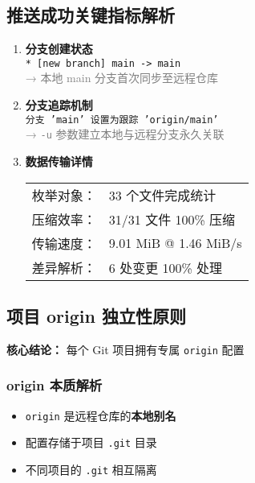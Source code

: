 \subsection{推送成功关键指标解析}
\begin{enumerate}[leftmargin=*, nosep]
    \item \textbf{分支创建状态} \\
    \texttt{* [new branch] main -> main} \\
    \textcolor{gray}{→ 本地 main 分支首次同步至远程仓库}
    
    \item \textbf{分支追踪机制} \\
    \texttt{分支 'main' 设置为跟踪 'origin/main'} \\
    \textcolor{gray}{→ \texttt{-u} 参数建立本地与远程分支永久关联}
    
    \item \textbf{数据传输详情} \\
    \begin{tabular}{@{}ll@{}}
        枚举对象： & 33 个文件完成统计 \\
        压缩效率： & 31/31 文件 100\% 压缩 \\
        传输速度： & 9.01 MiB @ 1.46 MiB/s \\
        差异解析： & 6 处变更 100\% 处理 \\
    \end{tabular}
\end{enumerate}

\subsection{项目 origin 独立性原则}
\textbf{核心结论：} 每个 Git 项目拥有专属 \texttt{origin} 配置

\subsubsection{origin 本质解析}
\begin{itemize}[leftmargin=*, nosep]
    \item \texttt{origin} 是远程仓库的\textbf{本地别名}
    \item 配置存储于项目 \texttt{.git} 目录
    \item 不同项目的 \texttt{.git} 相互隔离
\end{itemize}

